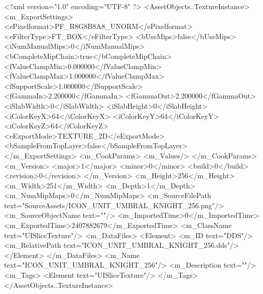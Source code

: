 <?xml version="1.0" encoding="UTF-8" ?>
<AssetObjects..TextureInstance>
	<m_ExportSettings>
		<ePixelformat>PF_R8G8B8A8_UNORM</ePixelformat>
		<eFilterType>FT_BOX</eFilterType>
		<bUseMips>false</bUseMips>
		<iNumManualMips>0</iNumManualMips>
		<bCompleteMipChain>true</bCompleteMipChain>
		<fValueClampMin>0.000000</fValueClampMin>
		<fValueClampMax>1.000000</fValueClampMax>
		<fSupportScale>1.000000</fSupportScale>
		<fGammaIn>2.200000</fGammaIn>
		<fGammaOut>2.200000</fGammaOut>
		<iSlabWidth>0</iSlabWidth>
		<iSlabHeight>0</iSlabHeight>
		<iColorKeyX>64</iColorKeyX>
		<iColorKeyY>64</iColorKeyY>
		<iColorKeyZ>64</iColorKeyZ>
		<eExportMode>TEXTURE_2D</eExportMode>
		<bSampleFromTopLayer>false</bSampleFromTopLayer>
	</m_ExportSettings>
	<m_CookParams>
		<m_Values/>
	</m_CookParams>
	<m_Version>
		<major>1</major>
		<minor>0</minor>
		<build>0</build>
		<revision>0</revision>
	</m_Version>
	<m_Height>256</m_Height>
	<m_Width>251</m_Width>
	<m_Depth>1</m_Depth>
	<m_NumMipMaps>0</m_NumMipMaps>
	<m_SourceFilePath text="SourceAssets/ICON_UNIT_UMBRAL_KNIGHT_256.png"/>
	<m_SourceObjectName text=""/>
	<m_ImportedTime>0</m_ImportedTime>
	<m_ExportedTime>2407882679</m_ExportedTime>
	<m_ClassName text="UISliceTexture"/>
	<m_DataFiles>
		<Element>
			<m_ID text="DDS"/>
			<m_RelativePath text="ICON_UNIT_UMBRAL_KNIGHT_256.dds"/>
		</Element>
	</m_DataFiles>
	<m_Name text="ICON_UNIT_UMBRAL_KNIGHT_256"/>
	<m_Description text=""/>
	<m_Tags>
		<Element text="UISliceTexture"/>
	</m_Tags>
</AssetObjects..TextureInstance>

